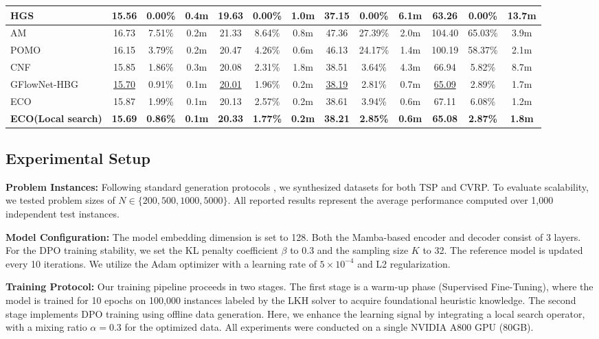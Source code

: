 \documentclass{article}
\theoremstyle{plain}
\theoremstyle{definition}
\theoremstyle{remark}
\begin{document}
\begin{table}[t]
{\begin{tabular}{l|ccc|ccc|ccc|ccc}
HGS & 15.56 & 0.00\% & 0.4m & 19.63 & 0.00\% & 1.0m & 37.15 & 0.00\% & 6.1m & 63.26 & 0.00\% & 13.7m \\ \midrule
AM & 16.73 & 7.51\% & 0.2m & 21.33 & 8.64\% & 0.8m & 47.36 & 27.39\% & 2.0m & 104.40 & 65.03\% & 3.9m \\
POMO & 16.15 & 3.79\% & 0.2m & 20.47 & 4.26\% & 0.6m & 46.13 & 24.17\% & 1.4m & 100.19 & 58.37\% & 2.1m \\
CNF & 15.85 & 1.86\% & 0.3m & 20.08 & 2.31\% & 1.8m & 38.51 & 3.64\% & 4.3m & 66.94 & 5.82\% & 8.7m \\
GFlowNet-HBG & \underline{15.70} & 0.91\% & 0.1m & \underline{20.01} & 1.96\% & 0.2m & \underline{38.19} & 2.81\% & 0.7m & \underline{65.09} & 2.89\% & 1.7m \\
ECO & 15.87 & 1.99\% & 0.1m & 20.13 & 2.57\% & 0.2m & 38.61 & 3.94\% & 0.6m & 67.11 & 6.08\% & 1.2m \\
\textbf{ECO(Local search)} & \textbf{15.69} & \textbf{0.86\%} & \textbf{0.1m} & \textbf{20.33} & \textbf{1.77\%} & \textbf{0.2m} & \textbf{38.21} & \textbf{2.85\%} & \textbf{0.6m} & \textbf{65.08} & \textbf{2.87\%} & \textbf{1.8m} \\ \bottomrule
\end{tabular}%
}
\end{table}




\subsection{Experimental Setup}


\textbf{Problem Instances:} Following standard generation protocols \cite{3}, we synthesized datasets for both TSP and CVRP. To evaluate scalability, we tested problem sizes of $N \in \{200, 500, 1000, 5000\}$. All reported results represent the average performance computed over 1,000 independent test instances.


\textbf{Model Configuration:} The model embedding dimension is set to 128. Both the Mamba-based encoder and decoder consist of 3 layers. For the DPO training stability, we set the KL penalty coefficient $\beta$ to 0.3 and the sampling size $K$ to 32. The reference model is updated every 10 iterations. We utilize the Adam optimizer with a learning rate of $5 \times 10^{-4}$ and L2 regularization.

\textbf{Training Protocol:} Our training pipeline proceeds in two stages. The first stage is a warm-up phase (Supervised Fine-Tuning), where the model is trained for 10 epochs on 100,000 instances labeled by the LKH solver to acquire foundational heuristic knowledge. The second stage implements DPO training using offline data generation. Here, we enhance the learning signal by integrating a local search operator, with a mixing ratio $\alpha = 0.3$ for the optimized data. All experiments were conducted on a single NVIDIA A800 GPU (80GB).
\end{document}
